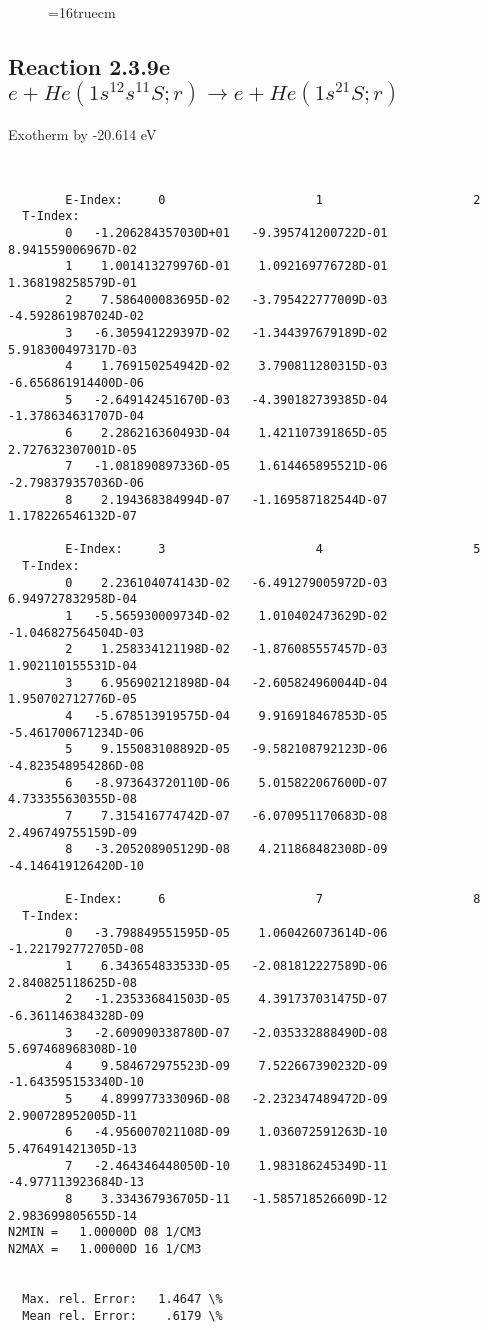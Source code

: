 \documentclass[12pt,dvipdfmx]{article}
\begin{document}
\begin{figure} \label{2.3.9d}
\epsfxsize=16truecm
\end{figure}
\newpage


\subsection{
Reaction 2.3.9e  $e + He(1s^12s^11S;r) \rightarrow e + He(1s^21S;r) $
}
Exotherm by -20.614 eV

\begin{small}\begin{verbatim}


        E-Index:     0                     1                     2
  T-Index:
        0   -1.206284357030D+01   -9.395741200722D-01    8.941559006967D-02
        1    1.001413279976D-01    1.092169776728D-01    1.368198258579D-01
        2    7.586400083695D-02   -3.795422777009D-03   -4.592861987024D-02
        3   -6.305941229397D-02   -1.344397679189D-02    5.918300497317D-03
        4    1.769150254942D-02    3.790811280315D-03   -6.656861914400D-06
        5   -2.649142451670D-03   -4.390182739385D-04   -1.378634631707D-04
        6    2.286216360493D-04    1.421107391865D-05    2.727632307001D-05
        7   -1.081890897336D-05    1.614465895521D-06   -2.798379357036D-06
        8    2.194368384994D-07   -1.169587182544D-07    1.178226546132D-07

        E-Index:     3                     4                     5
  T-Index:
        0    2.236104074143D-02   -6.491279005972D-03    6.949727832958D-04
        1   -5.565930009734D-02    1.010402473629D-02   -1.046827564504D-03
        2    1.258334121198D-02   -1.876085557457D-03    1.902110155531D-04
        3    6.956902121898D-04   -2.605824960044D-04    1.950702712776D-05
        4   -5.678513919575D-04    9.916918467853D-05   -5.461700671234D-06
        5    9.155083108892D-05   -9.582108792123D-06   -4.823548954286D-08
        6   -8.973643720110D-06    5.015822067600D-07    4.733355630355D-08
        7    7.315416774742D-07   -6.070951170683D-08    2.496749755159D-09
        8   -3.205208905129D-08    4.211868482308D-09   -4.146419126420D-10

        E-Index:     6                     7                     8
  T-Index:
        0   -3.798849551595D-05    1.060426073614D-06   -1.221792772705D-08
        1    6.343654833533D-05   -2.081812227589D-06    2.840825118625D-08
        2   -1.235336841503D-05    4.391737031475D-07   -6.361146384328D-09
        3   -2.609090338780D-07   -2.035332888490D-08    5.697468968308D-10
        4    9.584672975523D-09    7.522667390232D-09   -1.643595153340D-10
        5    4.899977333096D-08   -2.232347489472D-09    2.900728952005D-11
        6   -4.956007021108D-09    1.036072591263D-10    5.476491421305D-13
        7   -2.464346448050D-10    1.983186245349D-11   -4.977113923684D-13
        8    3.334367936705D-11   -1.585718526609D-12    2.983699805655D-14
N2MIN =   1.00000D 08 1/CM3
N2MAX =   1.00000D 16 1/CM3


  Max. rel. Error:   1.4647 \%
  Mean rel. Error:    .6179 \%


\end{verbatim}\end{small}
\end{document}
